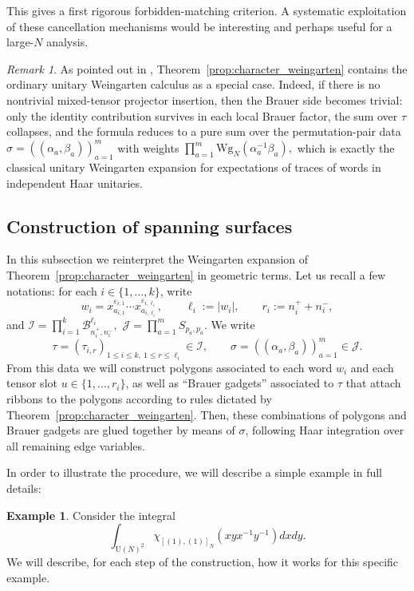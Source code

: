 \documentclass[11pt,a4paper,reqno]{article}
\theoremstyle{definition}
\newtheorem{example}[theorem]{Example}
\theoremstyle{remark}
\newtheorem{remark}[theorem]{Remark}
\newcommand\U{{\mathrm U}}
\newcommand\B{{\mathcal{B}}}
\begin{document}
This gives a first rigorous forbidden-matching criterion. A systematic exploitation of these cancellation mechanisms would be interesting and perhaps useful for a large-$N$ analysis.

\begin{remark}
As pointed out in \cite[Section 3]{Mag2}, Theorem~\ref{prop:character_weingarten} contains the ordinary unitary Weingarten calculus as a special case. Indeed, if there is no nontrivial mixed-tensor projector insertion, then the Brauer side becomes trivial: only the identity contribution survives in each local Brauer factor, the sum over $\tau$ collapses, and the formula reduces to a pure sum over the permutation-pair data $\sigma=((\alpha_a,\beta_a))_{a=1}^m$ with weights $\prod_{a=1}^m \mathrm{Wg}_N(\alpha_a^{-1}\beta_a),$ which is exactly the classical unitary Weingarten expansion for expectations of traces of words in independent Haar unitaries.
\end{remark}

\subsection{Construction of spanning surfaces}\label{sec:construction-spanning-surfaces}

In this subsection we reinterpret the Weingarten expansion of Theorem~\ref{prop:character_weingarten} in geometric terms. Let us recall a few notations: for each $i\in\{1,\dots,k\}$, write
\[
w_i=x_{a_{i,1}}^{\varepsilon_{i,1}}\cdots x_{a_{i,\ell_i}}^{\varepsilon_{i,\ell_i}},\qquad\ell_i:=|w_i|,\qquad r_i:=n_i^+ + n_i^-,
\]
and $\mathcal I=\prod_{i=1}^k \B_{n_i^+,n_i^-}^{\ell_i},$ $\mathcal J=\prod_{a=1}^m S_{p_a,p_a}.$ We write
\[
\tau=(\tau_{i,r})_{1\le i\le k,\ 1\le r\le \ell_i}\in \mathcal I,\qquad\sigma=((\alpha_a,\beta_a))_{a=1}^m\in \mathcal J.
\]
From this data we will construct polygons associated to each word $w_i$ and each tensor slot $u\in\{1,\ldots,r_i\}$, as well as ``Brauer gadgets'' associated to $\tau$ that attach ribbons to the polygons according to rules dictated by Theorem~\ref{prop:character_weingarten}. Then, these combinations of polygons and Brauer gadgets are glued together by means of $\sigma$, following Haar integration over all remaining edge variables.

In order to illustrate the procedure, we will describe a simple example in full details: 

\begin{example}\label{ex:surface}
Consider the integral
\[
\int_{\U(N)^2}\chi_{[(1),(1)]_N}(xyx^{-1}y^{-1})dxdy.
\]
We will describe, for each step of the construction, how it works for this specific example.
\end{example}
\end{document}
